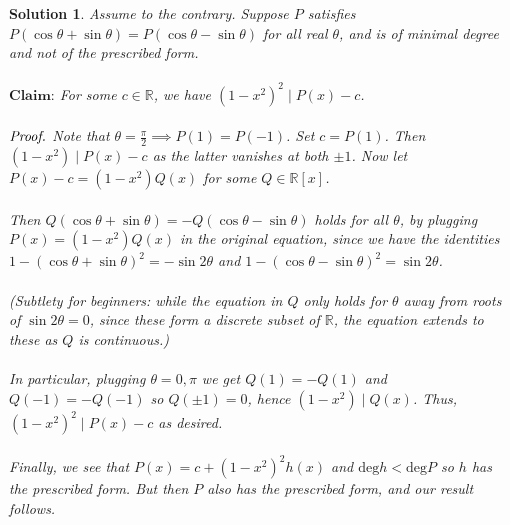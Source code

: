 \documentclass[12pt]{article}
\newtheorem*{solution*}{Solution}
\begin{document}
\begin{solution*}
Assume to the contrary. Suppose $P$ satisfies $P(\cos \theta + \sin \theta)=P(\cos \theta - \sin \theta)$ for all real $\theta$, and is of minimal degree and not of the prescribed form.
\\ \\
$\textbf{Claim:}$ For some $c \in \mathbb{R}$, we have $(1-x^2)^2 \mid P(x)-c$. 
\\ \\
$\emph{Proof.}$ Note that $\theta=\frac{\pi}{2} \implies P(1)=P(-1)$. Set $c=P(1)$. Then $(1-x^2) \mid P(x)-c$ as the latter vanishes at both $\pm 1$. Now let $P(x)-c=(1-x^2)Q(x)$ for some $Q \in \mathbb{R}[x]$. 
\\ \\
Then $Q(\cos \theta+\sin \theta)=-Q(\cos \theta-\sin \theta)$ holds for all $\theta$, by plugging $P(x)=(1-x^2)Q(x)$ in the original equation, since we have the identities $1-(\cos \theta + \sin \theta)^2=-\sin 2\theta$ and $1-(\cos \theta - \sin \theta)^2=\sin 2\theta$. 
\\ \\
(Subtlety for beginners: while the equation in $Q$ only holds for $\theta$ away from roots of $\sin 2\theta=0$, since these form a discrete subset of $\mathbb{R}$, the equation extends to these as $Q$ is continuous.)
\\ \\
In particular, plugging $\theta=0, \pi$ we get $Q(1)=-Q(1)$ and $Q(-1)=-Q(-1)$ so $Q(\pm 1)=0$, hence $(1-x^2) \mid Q(x)$. Thus, $(1-x^2)^2 \mid P(x)-c$ as desired.
\\ \\
Finally, we see that $P(x)=c+(1-x^2)^2h(x)$ and $\text{deg} h<\text{deg} P$ so $h$ has the prescribed form. But then $P$ also has the prescribed form, and our result follows.
\end{solution*}
\end{document}

